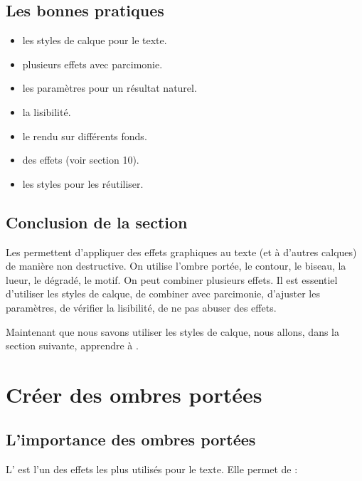 \subsection{Les bonnes pratiques}

\begin{itemize}
    \item {} les styles de calque pour le texte.
    \item {} plusieurs effets avec parcimonie.
    \item {} les paramètres pour un résultat naturel.
    \item {} la lisibilité.
    \item {} le rendu sur différents fonds.
    \item {} des effets (voir section 10).
    \item {} les styles pour les réutiliser.
\end{itemize}

\subsection*{Conclusion de la section}

Les  permettent d'appliquer des effets graphiques au texte (et à d'autres calques) de manière non destructive. On utilise l'ombre portée, le contour, le biseau, la lueur, le dégradé, le motif. On peut combiner plusieurs effets. Il est essentiel d'utiliser les styles de calque, de combiner avec parcimonie, d'ajuster les paramètres, de vérifier la lisibilité, de ne pas abuser des effets.

Maintenant que nous savons utiliser les styles de calque, nous allons, dans la section suivante, apprendre à .

\section{Créer des ombres portées}

\subsection{L'importance des ombres portées}

L' est l'un des effets les plus utilisés pour le texte. Elle permet de :

